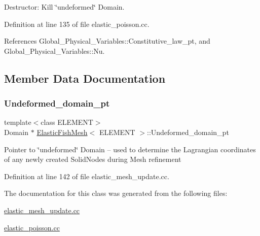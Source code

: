 Destructor\+: Kill \char`\"{}undeformed\char`\"{} Domain. 



Definition at line 135 of file elastic\+\_\+poisson.\+cc.



References Global\+\_\+\+Physical\+\_\+\+Variables\+::\+Constitutive\+\_\+law\+\_\+pt, and Global\+\_\+\+Physical\+\_\+\+Variables\+::\+Nu.



\subsection{Member Data Documentation}
\mbox{\label{classElasticFishMesh_acc86ce0248b350ee3e24142f393f2b08}} 
\subsubsection{\texorpdfstring{Undeformed\+\_\+domain\+\_\+pt}{Undeformed\_domain\_pt}}
{\footnotesize\ttfamily template$<$class E\+L\+E\+M\+E\+NT$>$ \\
Domain $\ast$ \hyperlink{classElasticFishMesh}{Elastic\+Fish\+Mesh}$<$ E\+L\+E\+M\+E\+NT $>$\+::Undeformed\+\_\+domain\+\_\+pt\hspace{0.3cm}{\ttfamily [private]}}

Pointer to \char`\"{}undeformed\char`\"{} Domain -- used to determine the Lagrangian coordinates of any newly created Solid\+Nodes during Mesh refinement 

Definition at line 142 of file elastic\+\_\+mesh\+\_\+update.\+cc.



The documentation for this class was generated from the following files\+:\begin{DoxyCompactItemize}
\item 
\hyperlink{elastic__mesh__update_8cc}{elastic\+\_\+mesh\+\_\+update.\+cc}\item 
\hyperlink{elastic__poisson_8cc}{elastic\+\_\+poisson.\+cc}\end{DoxyCompactItemize}
